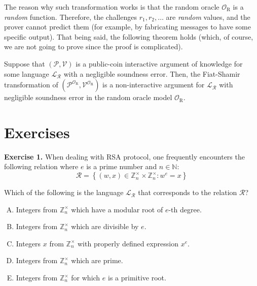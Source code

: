\documentclass[../lecture-notes.tex]{subfiles}
\begin{document}
The reason why such transformation works is that the random oracle $\mathcal{O}_{\text{R}}$ is a \textit{random} function. Therefore, the challenges $r_1,r_2,\dots$ are \textit{random} values, and the prover cannot predict them (for example, by fabricating messages to have some specific output). That being said, the following theorem holds (which, of course, we are not going to prove since the proof is complicated).

\begin{theorem}
    Suppose that $(\mathcal{P},\mathcal{V})$ is a public-coin interactive argument of knowledge for some language $\mathcal{L}_{\mathcal{R}}$ with a negligible soundness error. Then, the Fiat-Shamir transformation of $(\mathcal{P}^{\mathcal{O}_{\text{R}}},\mathcal{V}^{\mathcal{O}_{\text{R}}})$ is a non-interactive argument for $\mathcal{L}_{\mathcal{R}}$ with negligible soundness error in the random oracle model $\mathcal{O}_{\text{R}}$.
\end{theorem}

\section{Exercises}

\textbf{Exercise 1.} When dealing with RSA protocol, one frequently encounters the following relation where $e$ is a prime number and $n \in \mathbb{N}$:
\begin{equation*}
    \mathcal{R} = \left\{ (w, x) \in \mathbb{Z}_n^{\times} \times \mathbb{Z}_n^{\times}: w^e = x \right\}
\end{equation*}

Which of the following is the language $\mathcal{L}_{\mathcal{R}}$ that corresponds to the relation $\mathcal{R}$?
\begin{enumerate}[(A)]
    \item Integers from $\mathbb{Z}_n^{\times}$ which have a modular root of $e$-th degree.
    \item Integers from $\mathbb{Z}_n^{\times}$ which are divisible by $e$.
    \item Integers $x$ from $\mathbb{Z}_n^{\times}$ with properly defined expression $x^e$.
    \item Integers from $\mathbb{Z}_n^{\times}$ which are prime.
    \item Integers from $\mathbb{Z}_n^{\times}$ for which $e$ is a primitive root.
\end{enumerate}
\end{document}
